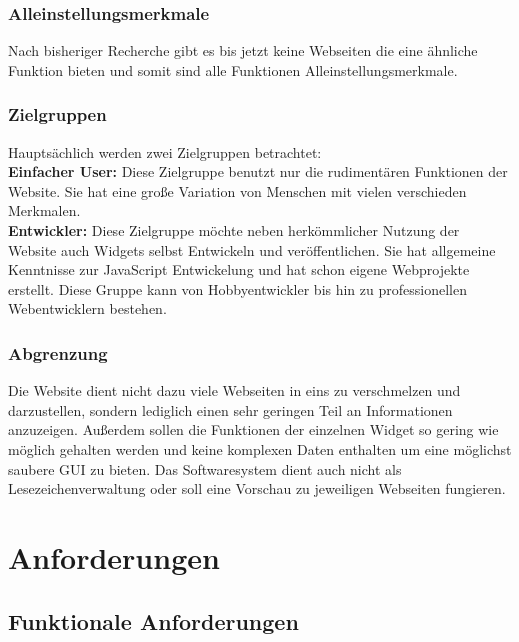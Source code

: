 		\subsubsection{Alleinstellungsmerkmale}  
			Nach bisheriger Recherche gibt es bis jetzt keine Webseiten die eine ähnliche Funktion bieten und somit sind alle Funktionen Alleinstellungsmerkmale.   
			
		\subsubsection{Zielgruppen}
			Hauptsächlich werden zwei Zielgruppen betrachtet: \\
			\textbf{Einfacher User: } Diese Zielgruppe benutzt nur die rudimentären Funktionen der Website. Sie hat eine große Variation von Menschen mit vielen verschieden Merkmalen.\\
			\textbf{Entwickler: }Diese Zielgruppe möchte neben herkömmlicher Nutzung der Website auch Widgets selbst Entwickeln und veröffentlichen. Sie hat allgemeine Kenntnisse zur JavaScript Entwickelung und hat schon eigene Webprojekte erstellt. Diese Gruppe kann von Hobbyentwickler bis hin zu professionellen Webentwicklern bestehen.   
			
		\subsubsection{Abgrenzung} 
			Die Website dient nicht dazu viele Webseiten in eins zu verschmelzen und darzustellen, sondern lediglich einen sehr geringen Teil an Informationen anzuzeigen. Außerdem sollen die Funktionen der einzelnen Widget so gering wie möglich gehalten werden und keine komplexen Daten enthalten um eine möglichst saubere GUI zu bieten. Das Softwaresystem dient auch nicht als Lesezeichenverwaltung oder soll eine Vorschau zu jeweiligen Webseiten fungieren.

\newpage				
\section{Anforderungen}

	\subsection{Funktionale Anforderungen}
